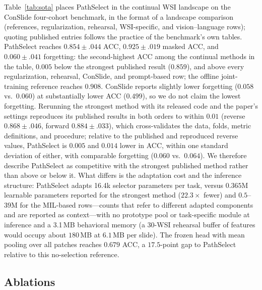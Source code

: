 \documentclass{article}
\begin{document}
Table~\ref{tab:sota} places PathSelect in the continual WSI landscape on the ConSlide four-cohort benchmark, in the format of a landscape comparison (references, regularization, rehearsal, WSI-specific, and vision--language rows); quoting published entries follows the practice of the benchmark's own tables. PathSelect reaches $0.854{\pm}.044$ ACC, $0.925{\pm}.019$ masked ACC, and $0.060{\pm}.041$ forgetting: the second-highest ACC among the continual methods in the table, $0.005$ below the strongest published result ($0.859$), and above every regularization, rehearsal, ConSlide, and prompt-based row; the offline joint-training reference reaches $0.908$. ConSlide reports slightly lower forgetting ($0.058$ vs.\ $0.060$) at substantially lower ACC ($0.499$), so we do not claim the lowest forgetting. Rerunning the strongest method with its released code and the paper's settings reproduces its published results in both orders to within $0.01$ (reverse $0.868{\pm}.046$, forward $0.884{\pm}.033$), which cross-validates the data, folds, metric definitions, and procedure; relative to the published and reproduced reverse values, PathSelect is $0.005$ and $0.014$ lower in ACC, within one standard deviation of either, with comparable forgetting ($0.060$ vs.\ $0.064$). We therefore describe PathSelect as competitive with the strongest published method rather than above or below it. What differs is the adaptation cost and the inference structure: PathSelect adapts 16.4k selector parameters per task, versus $0.365$M learnable parameters reported for the strongest method ($22.3\times$ fewer) and $0.5$--$39$M for the MIL-based rows---counts that refer to different adapted components and are reported as context---with no prototype pool or task-specific module at inference and a 3.1\,MB behavioral memory (a 30-WSI rehearsal buffer of features would occupy about $180$\,MB at $6.1$\,MB per slide). The frozen head with mean pooling over all patches reaches $0.679$ ACC, a $17.5$-point gap to PathSelect relative to this no-selection reference.

\subsection{Ablations}
\label{ssec:ablation}
\end{document}
